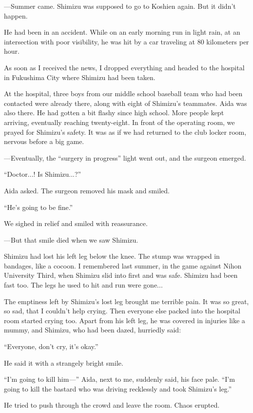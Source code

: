 \documentclass[
    a4paper,
    12pt,
    twoside,
    openany,
    UTF8,
    fontset=windows
]{ctexbook}
\begin{document}
---Summer came. Shimizu was supposed to go to Koshien again. But it didn't happen.

He had been in an accident. While on an early morning run in light rain, at an intersection with poor visibility, he was hit by a car traveling at 80 kilometers per hour.

As soon as I received the news, I dropped everything and headed to the hospital in Fukushima City where Shimizu had been taken.

At the hospital, three boys from our middle school baseball team who had been contacted were already there, along with eight of Shimizu's teammates. Aida was also there. He had gotten a bit flashy since high school. More people kept arriving, eventually reaching twenty-eight. In front of the operating room, we prayed for Shimizu's safety. It was as if we had returned to the club locker room, nervous before a big game.

---Eventually, the ``surgery in progress'' light went out, and the surgeon emerged.

``Doctor...! Is Shimizu...?''

Aida asked. The surgeon removed his mask and smiled.

``He's going to be fine.''

We sighed in relief and smiled with reassurance.

---But that smile died when we saw Shimizu.

Shimizu had lost his left leg below the knee. The stump was wrapped in bandages, like a cocoon. I remembered last summer, in the game against Nihon University Third, when Shimizu slid into first and was safe. Shimizu had been fast too. The legs he used to hit and run were gone...

The emptiness left by Shimizu's lost leg brought me terrible pain. It was so great, so sad, that I couldn't help crying. Then everyone else packed into the hospital room started crying too. Apart from his left leg, he was covered in injuries like a mummy, and Shimizu, who had been dazed, hurriedly said:

``Everyone, don't cry, it's okay.''

He said it with a strangely bright smile.

``I'm going to kill him---'' Aida, next to me, suddenly said, his face pale. ``I'm going to kill the bastard who was driving recklessly and took Shimizu's leg.''

He tried to push through the crowd and leave the room. Chaos erupted.
\end{document}
